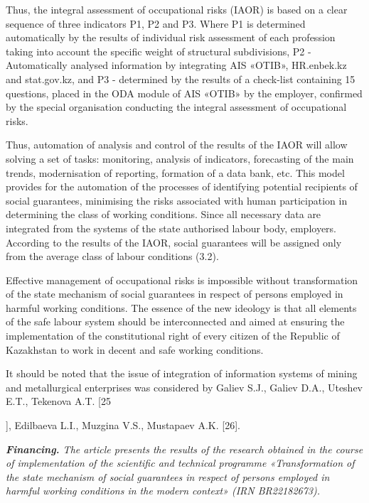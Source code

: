 \begin{multicols}{2}
Thus, the integral assessment of occupational risks (IAOR) is based on a
clear sequence of three indicators P1, P2 and P3. Where P1 is determined
automatically by the results of individual risk assessment of each
profession taking into account the specific weight of structural
subdivisions, P2 - Automatically analysed information by integrating AIS
«OTIB», HR.enbek.kz and stat.gov.kz, and P3 - determined by the results
of a check-list containing 15 questions, placed in the ODA module of AIS
«OTIB» by the employer, confirmed by the special organisation conducting
the integral assessment of occupational risks.

Thus, automation of analysis and control of the results of the IAOR will
allow solving a set of tasks: monitoring, analysis of indicators,
forecasting of the main trends, modernisation of reporting, formation of
a data bank, etc. This model provides for the automation of the
processes of identifying potential recipients of social guarantees,
minimising the risks associated with human participation in determining
the class of working conditions. Since all necessary data are integrated
from the systems of the state authorised labour body, employers.
According to the results of the IAOR, social guarantees will be assigned
only from the average class of labour conditions (3.2).

Effective management of occupational risks is impossible without
transformation of the state mechanism of social guarantees in respect of
persons employed in harmful working conditions. The essence of the new
ideology is that all elements of the safe labour system should be
interconnected and aimed at ensuring the implementation of the
constitutional right of every citizen of the Republic of Kazakhstan to
work in decent and safe working conditions.

It should be noted that the issue of integration of information systems
of mining and metallurgical enterprises was considered by Galiev S.J.,
Galiev D.A., Uteshev E.T., Tekenova A.T. {[}25

{]}, Edilbaeva L.I., Muzgina V.S., Mustapaev A.K. {[}26{]}.

\emph{{\bfseries Financing.} The article presents the results of the
research obtained in the course of implementation of the scientific and
technical programme «Transformation of the state mechanism of social
guarantees in respect of persons employed in harmful working conditions
in the modern context» (IRN BR22182673).}
\end{multicols}

